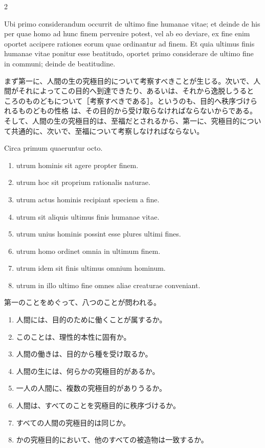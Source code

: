 \documentclass[paper=a4paper,fontsize=10pt,jafontsize=9pt,titlepage]{jlreq}
\begin{document}
\begin{paracol}{2}

Ubi primo considerandum occurrit de ultimo fine humanae vitae; et deinde
de his per quae homo ad hunc finem pervenire potest, vel ab eo deviare,
ex fine enim oportet accipere rationes eorum quae ordinantur ad
finem. Et quia ultimus finis humanae vitae ponitur esse beatitudo,
oportet primo considerare de ultimo fine in communi; deinde de
beatitudine.

\switchcolumn

まず第一に、人間の生の究極目的について考察すべきことが生じる。次いで、人
 間がそれによってこの目的へ到達できたり、あるいは、それから逸脱しうると
 ころのものどもについて［考察すべきである］。というのも、目的へ秩序づけられるものどもの性格
 は、その目的から受け取らなければならないからである。
そして、人間の生の究極目的は、至福だとされるから、第一に、究極目的につい
 て共通的に、次いで、至福について考察しなければならない。

\switchcolumn*

Circa primum quaeruntur octo. 

\begin{enumerate}
 \item utrum hominis sit agere propter finem.
 \item utrum hoc sit proprium rationalis naturae.
 \item utrum actus hominis recipiant speciem a fine.
 \item utrum sit aliquis ultimus finis humanae vitae.
 \item utrum unius hominis possint esse plures ultimi fines.
 \item utrum homo ordinet omnia in ultimum finem.
 \item utrum idem sit finis ultimus omnium hominum.
 \item utrum in illo ultimo fine omnes aliae creaturae conveniant.
\end{enumerate}

\switchcolumn

第一のことをめぐって、八つのことが問われる。
\begin{enumerate}
 \item 人間には、目的のために働くことが属するか。
 \item このことは、理性的本性に固有か。
 \item 人間の働きは、目的から種を受け取るか。
 \item 人間の生には、何らかの究極目的があるか。
 \item 一人の人間に、複数の究極目的がありうるか。
 \item 人間は、すべてのことを究極目的に秩序づけるか。
 \item すべての人間の究極目的は同じか。
 \item かの究極目的において、他のすべての被造物は一致するか。
\end{enumerate}

\end{paracol}
\end{document}
